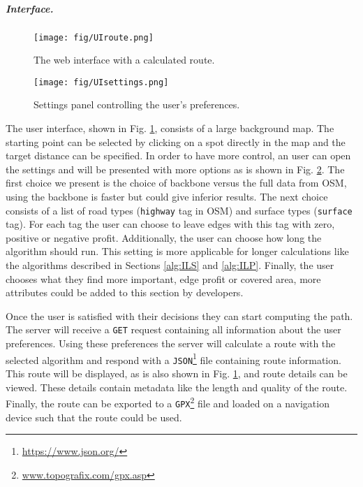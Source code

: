 \documentclass[sigconf,natbib=false]{acmart}
\begin{document}
\subparagraph*{\textbf{Interface.}}
\begin{figure}
    \centering
    \texttt{[image: fig/UIroute.png]}
    \caption{The web interface with a calculated route.}
    \label{fig:ui_index}
\end{figure}

\begin{figure}
    \centering
    \texttt{[image: fig/UIsettings.png]}
    \caption{Settings panel controlling the user's preferences.}
    \label{fig:ui_settings}
\end{figure}

The user interface, shown in Fig. \ref{fig:ui_index}, consists of a large background map. The starting point can be selected by clicking on a spot directly in the map and the target distance can be specified. In order to have more control, an user can open the settings and will be presented with more options as is shown in Fig. \ref{fig:ui_settings}.
The first choice we present is the choice of backbone versus the full data from OSM, using the backbone is faster but could give inferior results.
The next choice consists of a list of road types (\texttt{highway} tag in OSM) and surface types (\texttt{surface} tag).
For each tag the user can choose to leave edges with this tag with zero, positive or negative profit.
Additionally, the user can choose how long the algorithm should run. This setting is more applicable for longer calculations like the algorithms described in Sections \ref{alg:ILS} and \ref{alg:ILP}.
Finally, the user chooses what they find more important, edge profit or covered area, more attributes could be added to this section by developers.

Once the user is satisfied with their decisions they can start computing the path. The server will receive a \texttt{GET} request containing all information about the user preferences. Using these preferences the server will calculate a route with the selected algorithm and respond with a \texttt{JSON}\footnote{\url{https://www.json.org/}} file containing route information. This route will be displayed, as is also shown in Fig. \ref{fig:ui_index}, and route details can be viewed. These details contain metadata like the length and quality of the route. Finally, the route can be exported to a \texttt{GPX}\footnote{\url{www.topografix.com/gpx.asp}} file and loaded on a navigation device such that the route could be used.
\end{document}
